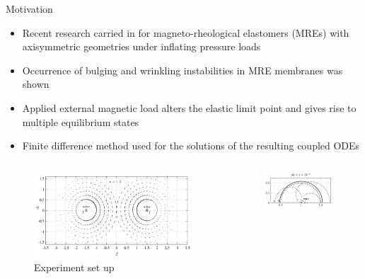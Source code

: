 \documentclass{beamer}
\begin{document}
\begin{frame}{Motivation}
\begin{itemize}
\item Recent research carried in \cite{reddy_toroid,Reddy2018} for magneto-rheological elastomers (MREs) with axisymmetric geometries under inflating pressure loads
\item Occurrence of bulging and wrinkling instabilities in MRE membranes was shown
\item Applied external magnetic load alters the elastic limit point and gives rise to multiple equilibrium states
\item Finite difference method used for the solutions of the resulting coupled ODEs 
\end{itemize}
\begin{columns}
\begin{column}{0.28\textwidth}
\begin{figure}
\centering
\includegraphics[width=0.98\textwidth]{magnetic_field_saxena.png}
\caption{Experiment set up \cite{reddy_toroid}}
\end{figure}
\end{column}
\begin{column}{0.28\textwidth}
\begin{figure}
\centering
\includegraphics[width=0.98\textwidth]{torus_deformed.png}

\end{figure}
\end{column}
\end{columns}
\end{frame}
\end{document}
